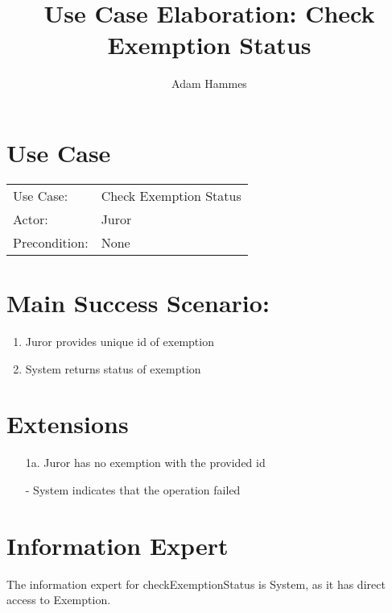 \documentclass{article}
\title{Use Case Elaboration: Check Exemption Status}
\author{Adam Hammes}
\begin{document}
\maketitle

\section*{Use Case}
\begin{tabular}{l l}
  Use Case:     & Check Exemption Status\\
  Actor:        & Juror \\
  Precondition: & None \\
\end{tabular}

\section*{Main Success Scenario:}
\begin{enumerate}
  \item Juror provides unique id of exemption
  \item System returns status of exemption
\end{enumerate}

\section*{Extensions}
\begin{itemize}
  \item [1a.] Juror has no exemption with the provided id
  
  - System indicates that the operation failed

\end{itemize}

\section*{Information Expert}

The information expert for checkExemptionStatus is System, as it has direct access to Exemption.
\end{document}
